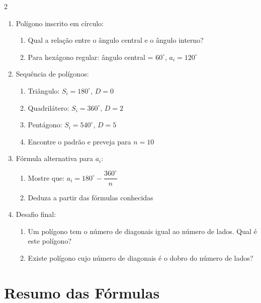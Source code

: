 \documentclass[11pt]{article}
\begin{document}
\begin{multicols}{2}
\begin{enumerate}[leftmargin=*, start=11]
\item Polígono inscrito em círculo:
\begin{center}
\end{center}
\begin{enumerate}[label=\alph*)]
\item Qual a relação entre o ângulo central e o ângulo interno?
\item Para hexágono regular: ângulo central = $60^\circ$, $a_i = 120^\circ$
\end{enumerate}

\item Sequência de polígonos:
\begin{enumerate}[label=\alph*)]
\item Triângulo: $S_i = 180^\circ$, $D = 0$
\item Quadrilátero: $S_i = 360^\circ$, $D = 2$
\item Pentágono: $S_i = 540^\circ$, $D = 5$
\item Encontre o padrão e preveja para $n=10$
\end{enumerate}

\item Fórmula alternativa para $a_i$:
\begin{enumerate}[label=\alph*)]
\item Mostre que: $a_i = 180^\circ - \dfrac{360^\circ}{n}$
\item Deduza a partir das fórmulas conhecidas
\end{enumerate}

\item Desafio final:
\begin{enumerate}[label=\alph*)]
\item Um polígono tem o número de diagonais igual ao número de lados. Qual é este polígono?
\item Existe polígono cujo número de diagonais é o dobro do número de lados?
\end{enumerate}

\end{enumerate}

\section*{Resumo das Fórmulas}


\end{multicols}
\end{document}
